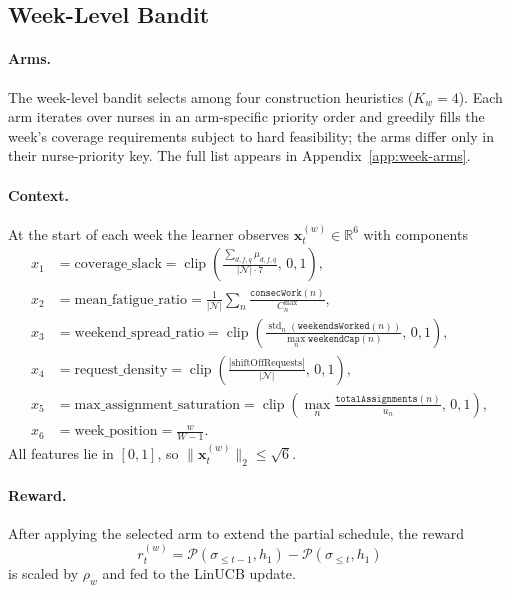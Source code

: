 \documentclass{article}
\begin{document}
\subsection{Week-Level Bandit}

\paragraph{Arms.}
The week-level bandit selects among four construction heuristics
($K_w = 4$). Each arm iterates over nurses in an arm-specific priority
order and greedily fills the week's coverage requirements subject to hard
feasibility; the arms differ only in their nurse-priority key. The full
list appears in Appendix~\ref{app:week-arms}.

\paragraph{Context.}
At the start of each week the learner observes
$\mathbf{x}^{(w)}_t \in \mathbb{R}^{6}$ with components
\begin{align*}
x_1 &= \text{coverage\_slack}
  = \operatorname{clip}\!\left(\tfrac{\sum_{d,f,q}\mu_{d,f,q}}{|\mathcal{N}|\cdot 7},\, 0, 1\right), \\
x_2 &= \text{mean\_fatigue\_ratio}
  = \tfrac{1}{|\mathcal{N}|}\sum_n \tfrac{\texttt{consecWork}(n)}{C_n^{\max}}, \\
x_3 &= \text{weekend\_spread\_ratio}
  = \operatorname{clip}\!\left(\tfrac{\operatorname{std}_n(\texttt{weekendsWorked}(n))}{\max_n \texttt{weekendCap}(n)},\, 0, 1\right), \\
x_4 &= \text{request\_density}
  = \operatorname{clip}\!\left(\tfrac{|\text{shiftOffRequests}|}{|\mathcal{N}|},\, 0, 1\right), \\
x_5 &= \text{max\_assignment\_saturation}
  = \operatorname{clip}\!\left(\max_n \tfrac{\texttt{totalAssignments}(n)}{u_n},\, 0, 1\right), \\
x_6 &= \text{week\_position}
  = \tfrac{w}{W-1}.
\end{align*}
All features lie in $[0,1]$, so $\|\mathbf{x}^{(w)}_t\|_2 \le \sqrt{6}$.

\paragraph{Reward.}
After applying the selected arm to extend the partial schedule, the reward
\[
r^{(w)}_t
= \mathcal{P}(\sigma_{\le t-1}, h_1) - \mathcal{P}(\sigma_{\le t}, h_1)
\]
is scaled by $\rho_w$ and fed to the LinUCB update.
\end{document}
